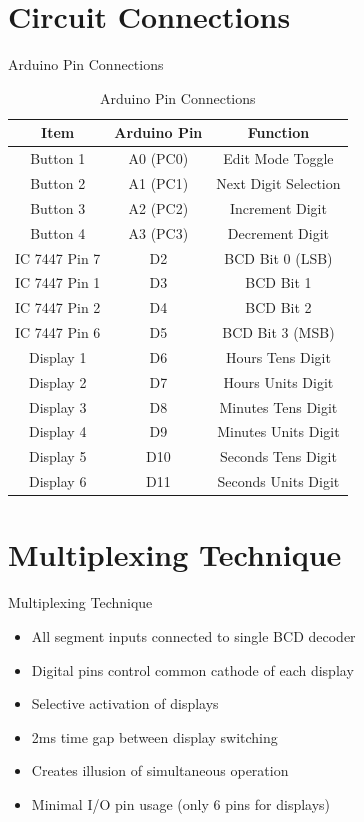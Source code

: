 \documentclass{beamer}
\begin{document}
\section{Circuit Connections}
\begin{frame}{Arduino Pin Connections}
    \begin{table}
        \centering
        \begin{tabular}{|c|c|c|}
        \hline
        \textbf{Item} & \textbf{Arduino Pin} & \textbf{Function}\\
        \hline
        Button 1 & A0 (PC0) & Edit Mode Toggle\\
        \hline
        Button 2 & A1 (PC1) & Next Digit Selection\\
        \hline
        Button 3 & A2 (PC2) & Increment Digit\\
        \hline
        Button 4 & A3 (PC3) & Decrement Digit\\
        \hline
        IC 7447 Pin 7 & D2 & BCD Bit 0 (LSB)\\
        \hline
        IC 7447 Pin 1 & D3 & BCD Bit 1\\
        \hline
        IC 7447 Pin 2 & D4 & BCD Bit 2\\
        \hline
        IC 7447 Pin 6 & D5 & BCD Bit 3 (MSB)\\
        \hline
        Display 1 & D6 & Hours Tens Digit\\
        \hline
        Display 2 & D7 & Hours Units Digit\\
        \hline
        Display 3 & D8 & Minutes Tens Digit\\
        \hline
        Display 4 & D9 & Minutes Units Digit\\
        \hline
        Display 5 & D10 & Seconds Tens Digit\\
        \hline
        Display 6 & D11 & Seconds Units Digit\\
        \hline
        \end{tabular}
        \caption{Arduino Pin Connections}
    \end{table}
\end{frame}



\section{Multiplexing Technique}
\begin{frame}{Multiplexing Technique}
    \begin{itemize}
        \item All segment inputs connected to single BCD decoder
        \item Digital pins control common cathode of each display
        \item Selective activation of displays
        \item 2ms time gap between display switching
        \item Creates illusion of simultaneous operation
        \item Minimal I/O pin usage (only 6 pins for displays)
    \end{itemize}
\end{frame}
\end{document}
